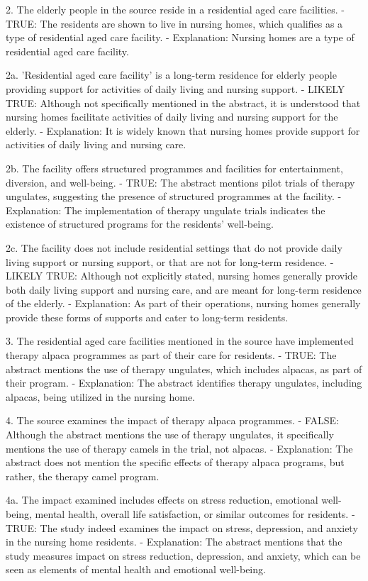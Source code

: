\documentclass{article}
\begin{document}
\begin{description}
  2. The elderly people in the source reside in a residential aged care
  facilities. - TRUE: The residents are shown to live in nursing homes, which
  qualifies as a type of residential aged care facility. - Explanation: Nursing
  homes are a type of residential aged care facility.

  2a. 'Residential aged care facility' is a long-term residence for elderly
  people providing support for activities of daily living and nursing support.
  - LIKELY TRUE: Although not specifically mentioned in the abstract, it is
  understood that nursing homes facilitate activities of daily living and
  nursing support for the elderly. - Explanation: It is widely known that
  nursing homes provide support for activities of daily living and nursing
  care.

  2b. The facility offers structured programmes and facilities for
  entertainment, diversion, and well-being. - TRUE: The abstract mentions pilot
  trials of therapy ungulates, suggesting the presence of structured programmes
  at the facility. - Explanation: The implementation of therapy ungulate trials
  indicates the existence of structured programs for the residents' well-being.

  2c. The facility does not include residential settings that do not provide
  daily living support or nursing support, or that are not for long-term
  residence. - LIKELY TRUE: Although not explicitly stated, nursing homes
  generally provide both daily living support and nursing care, and are meant
  for long-term residence of the elderly. - Explanation: As part of their
  operations, nursing homes generally provide these forms of supports and cater
  to long-term residents.

  3. The residential aged care facilities mentioned in the source have
  implemented therapy alpaca programmes as part of their care for residents. -
  TRUE: The abstract mentions the use of therapy ungulates, which includes
  alpacas, as part of their program. - Explanation: The abstract identifies
  therapy ungulates, including alpacas, being utilized in the nursing home.

  4. The source examines the impact of therapy alpaca programmes. - FALSE:
  Although the abstract mentions the use of therapy ungulates, it specifically
  mentions the use of therapy camels in the trial, not alpacas. - Explanation:
  The abstract does not mention the specific effects of therapy alpaca
  programs, but rather, the therapy camel program.

  4a. The impact examined includes effects on stress reduction, emotional
  well-being, mental health, overall life satisfaction, or similar outcomes for
  residents. - TRUE: The study indeed examines the impact on stress,
  depression, and anxiety in the nursing home residents. - Explanation: The
  abstract mentions that the study measures impact on stress reduction,
  depression, and anxiety, which can be seen as elements of mental health and
  emotional well-being.


\end{description}
\end{document}
